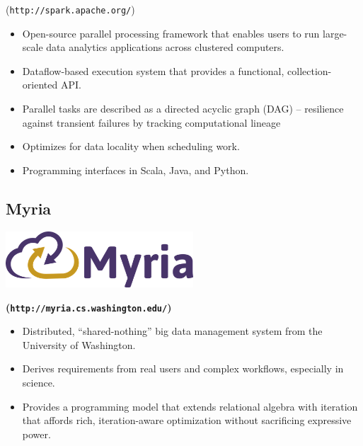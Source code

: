 \documentclass[a0,landscape]{a0poster}
\begin{document}
\begin{multicols}{3}
(\texttt{http://spark.apache.org/})

\small

\begin{itemize}
\item Open-source parallel processing framework that enables users to run large-scale data analytics applications across clustered computers.

\item Dataflow-based execution system that provides a functional, collection-oriented API.

\item Parallel tasks are described as a directed acyclic graph (DAG) -- resilience against transient failures by tracking computational lineage

\item Optimizes for data locality when scheduling work.

\item Programming interfaces in Scala, Java, and Python.

\end{itemize}

\begin{minipage}[b]{0.75\linewidth}
  \subsection*{Myria}
\end{minipage}
\begin{minipage}[b]{0.25\linewidth}
  \includegraphics[width=7cm]{myria-logo.png}
\end{minipage}

\textbf{(\texttt{http://myria.cs.washington.edu/})}
\begin{itemize}
  \item Distributed, ``shared-nothing'' big data management system from the University of Washington.

  \item  Derives requirements from real users and complex workflows, especially in science.

   \item Provides a programming model that extends relational algebra with iteration that affords rich, iteration-aware optimization without sacrificing expressive power.


\end{itemize}
\end{multicols}
\end{document}
